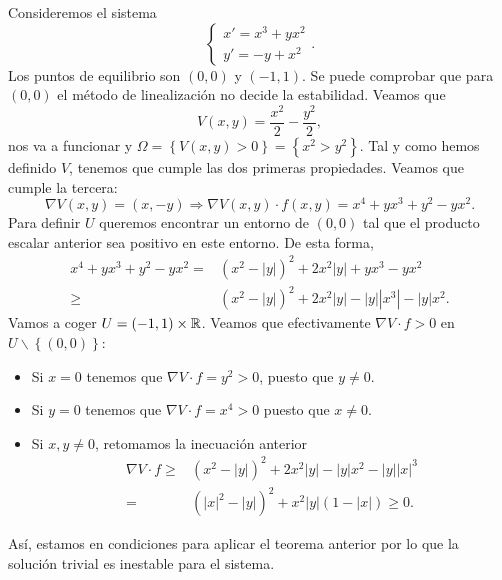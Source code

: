 \begin{eg}
Consideremos el sistema 
\[
\begin{cases}
x' = x^{3} + yx^{2} \\
y' = - y + x^{2}
\end{cases}
.\]
Los puntos de equilibrio son $\displaystyle \left(0,0\right) $ y $\displaystyle \left(-1,1\right) $. Se puede comprobar que para $\displaystyle \left(0,0\right) $ el método de linealización no decide la estabilidad. 
Veamos que 
\[V\left(x,y\right)=\frac{x^{2}}{2}-\frac{y^{2}}{2} ,\]
nos va a funcionar y $\displaystyle \Omega = \left\{ V\left(x,y\right)>0\right\} = \left\{ x^{2} > y^{2}\right\}  $. Tal y como hemos definido $\displaystyle V $, tenemos que cumple las dos primeras propiedades. Veamos que cumple la tercera:
\[\nabla V\left(x,y\right) = \left(x, -y\right) \Rightarrow \nabla V\left(x,y\right) \cdot f\left(x,y\right)= x^{4}+yx^{3}+y^{2}-yx^{2}.\]
Para definir $\displaystyle U $ queremos encontrar un entorno de $\displaystyle \left(0,0\right) $ tal que el producto escalar anterior sea positivo en este entorno. De esta forma, 
\[
\begin{split}
	x^{4}+yx^{3}+y^{2}-yx^{2} = & \left(x^{2}- \left|y\right|\right)^{2}+2x^{2} \left|y\right|+yx^{3}-yx^{2} \\
	\geq & \left(x^{2}- \left|y\right|\right)^{2} + 2x^{2} \left|y\right|- \left|y\right| \left|x^{3}\right|- \left|y\right|x^{2}.
\end{split}
\]
Vamos a coger $\displaystyle U = \left(-1,1\right)\times \mathbb{R} $. Veamos que efectivamente $\displaystyle \nabla V \cdot f > 0 $ en $\displaystyle U \backslash \left\{ \left(0,0\right)\right\}  $:
\begin{itemize}
\item Si $\displaystyle x = 0 $ tenemos que $\displaystyle \nabla V \cdot f  = y^{2} > 0$, puesto que $\displaystyle y \neq 0 $.
\item Si $\displaystyle y = 0 $ tenemos que $\displaystyle \nabla V \cdot f = x^{4} > 0 $ puesto que $\displaystyle x \neq 0 $. 
\item Si $\displaystyle x,y\neq 0 $, retomamos la inecuación anterior
	\[
	\begin{split}
		\nabla V \cdot f \geq & \left(x^{2}- \left|y\right|\right)^{2}+2x^{2} \left|y\right|- \left|y\right|x^{2}- \left|y\right| \left|x\right|^{3}  \\
	= &  \left( \left|x\right|^{2}- \left|y\right|\right)^{2} + x^{2} \left|y\right|\left(1- \left|x\right|\right) \geq 0.
	\end{split}
	\]
\end{itemize}
Así, estamos en condiciones para aplicar el teorema anterior por lo que la solución trivial es inestable para el sistema. 
\end{eg}

